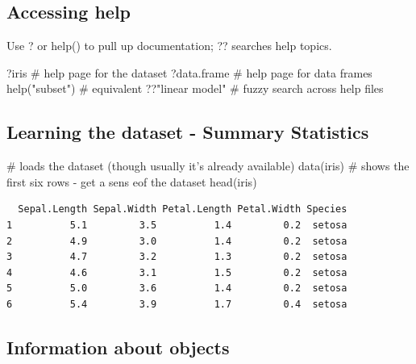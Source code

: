 \documentclass[
  letterpaper,
  DIV=11,
  numbers=noendperiod]{scrreprt}
\newenvironment{Shaded}{\begin{snugshade}}{\end{snugshade}}
\newcommand{\CommentTok}[1]{\textcolor[rgb]{0.37,0.37,0.37}{#1}}
\newcommand{\FunctionTok}[1]{\textcolor[rgb]{0.28,0.35,0.67}{#1}}
\newcommand{\NormalTok}[1]{\textcolor[rgb]{0.00,0.23,0.31}{#1}}
\newcommand{\StringTok}[1]{\textcolor[rgb]{0.13,0.47,0.30}{#1}}
\begin{document}
\subsection{Accessing help}\label{accessing-help}

Use ? or help() to pull up documentation; ?? searches help topics.

\begin{Shaded}
\begin{Highlighting}[]
\NormalTok{?iris                  }\CommentTok{\# help page for the dataset}
\NormalTok{?data.frame            }\CommentTok{\# help page for data frames}
\FunctionTok{help}\NormalTok{(}\StringTok{"subset"}\NormalTok{)         }\CommentTok{\# equivalent}
\NormalTok{??}\StringTok{"linear model"}       \CommentTok{\# fuzzy search across help files}
\end{Highlighting}
\end{Shaded}

\subsection{Learning the dataset - Summary
Statistics}\label{learning-the-dataset---summary-statistics}

\begin{Shaded}
\begin{Highlighting}[]
\CommentTok{\# loads the dataset (though usually it’s already available)}
\FunctionTok{data}\NormalTok{(iris)    }
\CommentTok{\# shows the first six rows {-} get a sens eof the dataset }
\FunctionTok{head}\NormalTok{(iris)     }
\end{Highlighting}
\end{Shaded}

\begin{verbatim}
  Sepal.Length Sepal.Width Petal.Length Petal.Width Species
1          5.1         3.5          1.4         0.2  setosa
2          4.9         3.0          1.4         0.2  setosa
3          4.7         3.2          1.3         0.2  setosa
4          4.6         3.1          1.5         0.2  setosa
5          5.0         3.6          1.4         0.2  setosa
6          5.4         3.9          1.7         0.4  setosa
\end{verbatim}

\subsection{Information about objects}\label{information-about-objects}
\end{document}
